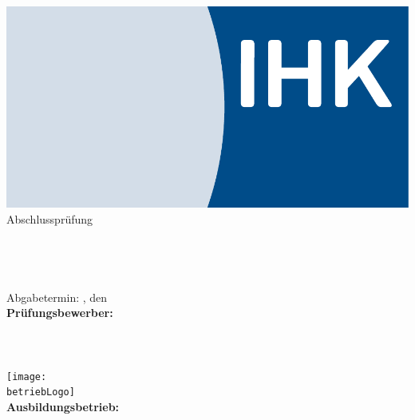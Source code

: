 \begin{titlepage}

\begin{center}
\includegraphics[scale=0.25]{Bilder/LogoIHK.pdf}\\[1ex]
\Large{Abschlussprüfung \pruefungstermin}\\[3ex]

\Large{\ausbildungsberuf}\\
\LARGE{\betreff}\\[4ex]

\huge{\textbf{\titel}}\\[1.5ex]
\Large{\textbf{\untertitel}}\\[3ex]

\normalsize
Abgabetermin: \abgabeOrt, den \abgabeTermin\\[3em]
\textbf{Prüfungsbewerber:}\\
\autorName\\
\autorAnschrift\\
\autorOrt\\[3ex]

\texttt{[image: \\betriebLogo]}\\[2ex]
\textbf{Ausbildungsbetrieb:}\\
\betriebName\\
\betriebAnschrift\\
\betriebOrt\\[5em]
\end{center}

\end{titlepage}